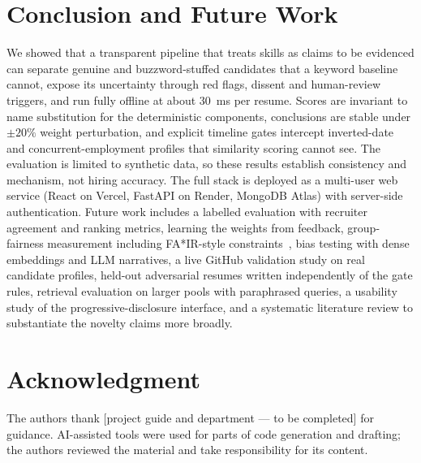 \documentclass[conference]{IEEEtran}
\begin{document}
\section{Conclusion and Future Work}
We showed that a transparent pipeline that treats skills as claims to be evidenced can separate genuine and buzzword-stuffed candidates that a keyword baseline cannot, expose its uncertainty through red flags, dissent and human-review triggers, and run fully offline at about 30~ms per resume. Scores are invariant to name substitution for the deterministic components, conclusions are stable under $\pm20\%$ weight perturbation, and explicit timeline gates intercept inverted-date and concurrent-employment profiles that similarity scoring cannot see. The evaluation is limited to synthetic data, so these results establish consistency and mechanism, not hiring accuracy. The full stack is deployed as a multi-user web service (React on Vercel, FastAPI on Render, MongoDB Atlas) with server-side authentication. Future work includes a labelled evaluation with recruiter agreement and ranking metrics, learning the weights from feedback, group-fairness measurement including FA*IR-style constraints~\cite{fair}, bias testing with dense embeddings and LLM narratives, a live GitHub validation study on real candidate profiles, held-out adversarial resumes written independently of the gate rules, retrieval evaluation on larger pools with paraphrased queries, a usability study of the progressive-disclosure interface, and a systematic literature review to substantiate the novelty claims more broadly.

\section*{Acknowledgment}
The authors thank [project guide and department --- to be completed] for guidance. AI-assisted tools were used for parts of code generation and drafting; the authors reviewed the material and take responsibility for its content.
\end{document}
